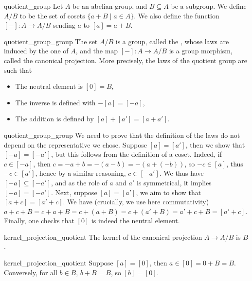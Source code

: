 \begin{cdef}{}{quotient_group}
    Let \( A \) be an abelian group, and \( B \subseteq A \) be a subgroup. We define \( A / B \) to be the set of cosets \( \{ a + B \mid a \in A \} \). We also define the function \( [-] : A \to A / B \) sending \( a \) to \( [a] = a + B \). 
\end{cdef}

\begin{clem}{}{quotient_group_group}
    The set \( A / B \) is a group, called the , whose laws are induced by the one of \( A \), and the map \( [-] : A \to A / B \) is a group morphism, called the canonical projection. More precisely, the laws of the quotient group are such that
    \begin{itemize}
        \item The neutral element is \( [0] = B \),
        \item The inverse is defined with \( - [a] = [- a] \), 
        \item The addition is defined by \( [a] + [a'] = [a + a'] \).
    \end{itemize}
\end{clem}
\begin{lemproof}{quotient_group_group}
     We need to prove that the definition of the laws do not depend on the representative we chose. Suppose \( [a] = [a'] \), then we show that \( [-a] = [- a'] \), but this follows from the definition of a coset. Indeed, if \( c \in [- a] \), then \( c = - a + b = - (a - b) = - (a + (- b)) \), so \( -c \in [a] \), thus \( -c \in [a'] \), hence by a similar reasoning, \( c \in [- a'] \). We thus have \( [-a] \subseteq [- a'] \), and as the role of \( a \) and \( a' \) is symmetrical, it implies \( [-a] = [- a'] \). Next, suppose \( [a] = [a'] \), we aim to show that \( [a + c] = [a' + c] \). We have (crucially, we use here commutativity) \( a + c + B = c + a + B = c + (a + B) = c + (a' + B) = a' + c + B = [a' + c] \). Finally, one checks that \( [0] \) is indeed the neutral element. 
\end{lemproof}

\begin{clem}{}{kernel_projection_quotient}
    The kernel of the canonical projection \( A \to A / B \) is \( B \).    
\end{clem}
\begin{lemproof}{kernel_projection_quotient}
    Suppose \( [a] = [0] \), then \( a \in [0] = 0 + B = B \). Conversely, for all \( b \in B \), \( b + B = B \), so \( [b] = [0] \).
\end{lemproof}

